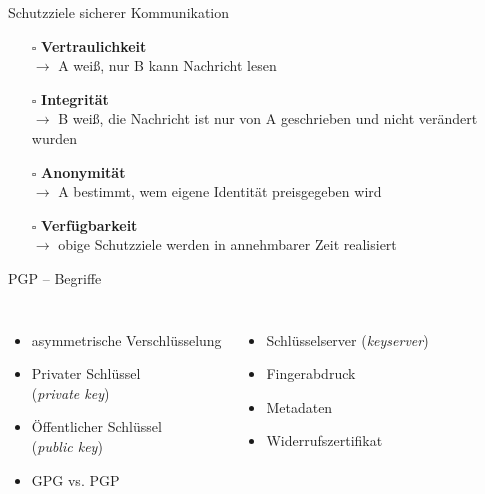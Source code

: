 \documentclass{beamer}
\begin{document}
\begin{frame}{Schutzziele sicherer Kommunikation}

  \begin{itemize}
   \item[$\square$] \textbf{Vertraulichkeit}\\
   $\rightarrow$ A weiß, nur B kann Nachricht lesen

   \pause

   \item[$\square$] \textbf{Integrität}\\
   $\rightarrow$ B weiß, die Nachricht ist nur von A geschrieben und nicht verändert wurden

   \pause

   \item[$\square$] \textbf{Anonymität}\\
   $\rightarrow$ A bestimmt, wem eigene Identität preisgegeben wird

   \pause

   \item[$\square$] \textbf{Verfügbarkeit}\\
   $\rightarrow$ obige Schutzziele werden in annehmbarer Zeit realisiert
  \end{itemize}

\end{frame}


\begin{frame}{PGP – Begriffe}

  \begin{columns}
  \begin{itemize}
   \item asymmetrische Verschlüsselung
   \item Privater Schlüssel\\(\textit{private key})
   \item Öffentlicher Schlüssel\\(\textit{public key})
   \item GPG vs. PGP
  \end{itemize}

  \pause

  \begin{itemize}
   \item Schlüsselserver (\textit{keyserver})
   \item Fingerabdruck
   \item Metadaten
   \item Widerrufszertifikat
  \end{itemize}
\end{columns}
\end{frame}
\end{document}
